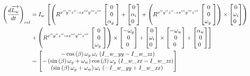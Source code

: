 \begin{align*}
\left(\frac{d\overrightarrow{L_{w}}}{dt}\right)_{rel}&=I_{w}\,\left[\left(R^{x''y''z'' \rightarrow x'''y'''z'''}\,\begin{bmatrix}
0\\
0\\
\alpha_{g}\
\end{bmatrix}
+\begin{bmatrix}
0\\
\alpha_{i}\\
0\
\end{bmatrix}
+\left(R^{x''y''z'' \rightarrow x'''y'''z'''}\,\begin{bmatrix}
0\\
0\\
\omega_{g}\
\end{bmatrix}
\right)\times\begin{bmatrix}
0\\
\omega_{i}\\
0\
\end{bmatrix}
\right)\right.\\
&\left.+\left(R^{x''y''z'' \rightarrow x'''y'''z'''}\,\begin{bmatrix}
0\\
0\\
\omega_{g}\
\end{bmatrix}\right)\times\begin{bmatrix}
-\omega_{g}\\
0\\
0\
\end{bmatrix}+\begin{bmatrix}
0\\
\omega_{i}\\
0\
\end{bmatrix}\times\begin{bmatrix}
-\omega_{w}\\
0\\
0\
\end{bmatrix}+\begin{bmatrix}
\alpha_{w}\\
0\\
0\
\end{bmatrix}
\right]\\
&=\begin{bmatrix}
-\cos \left( \beta \right) \omega_{g}\,
\omega_{i}\, \left( {\it I\_w\_yy}-{\it I\_w\_zz} \right) 
\\ 
%
- \left( \sin \left( \beta \right) \omega_{g}+
\omega_{w} \right) \cos \left( \beta \right) \omega_{g}\, \left( {\it 
I\_w\_xx}-{\it I\_w\_zz} \right) \\ 
%
 \left( \sin
 \left( \beta \right) \omega_{g}+\omega_{w} \right) \omega_{i}\,
 \left( -{\it I\_w\_yy}+{\it I\_w\_xx} \right) \
\end{bmatrix}
\end{align*}

